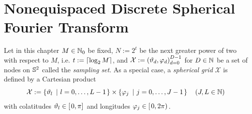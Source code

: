 \chapter{Nonequispaced Discrete Spherical Fourier Transform}
\label{DSFT}
Let in this chapter $M \in \mathbb{N}_{0}$ be fixed, $N := 2^t$ be the 
next greater power of two with respect to $M$, i.e. $t := {\left\lceil\log_2 M\right\rceil}$, and $\mathcal{X} := \left(\vartheta_d,\varphi_d\right)_{d=0}^{D-1}$ for $D \in \mathbb{N}$ be
a set of nodes on $\mathbb{S}^2$ called the \emph{sampling set}. As a special case, a \emph{spherical grid} 
$\mathcal{X}$ is defined by a Cartesian product 
$$
  \mathcal{X} := \left\{\vartheta_{l}\ \left|\ l=0,\ldots,L-1\right.\right\rbrace \times \left\{\varphi_{j}\ \left|\ j=0,\ldots,J-1\right.\right\rbrace \quad \left(J,L \in \mathbb{N}\right)
$$
with colatitudes $\vartheta_{l} \in \left[\left.0,\pi\right]\right.$ and longitudes $\varphi_{j} \in \left[\left.0,2\pi\right)\right.$.

